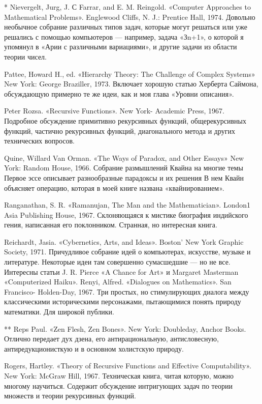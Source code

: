 * Nievergelt, Jurg, J. С Farrar, and E. M. Reingold. «Computer Approaches to Mathematical Problems». Englewood Cliffs, N. J.: Prentice Hall, 1974. Довольно необычное собрание различных типов задач, которые могут решаться или уже решались с помощью компьютеров --- например, задача «Зn+1», о которой я упомянул в «Арии с различными вариациями», и другие задачи из области теории чисел.

Pattee, Howard H., ed. «Hierarchy Theory: The Challenge of Complex Systems» New York: George Braziller, 1973. Включает хорошую статью Херберта Саймона, обсуждающую примерно те же идеи, как и моя глава «Уровни описания».

Peter Rozsa. «Recursive Functions». New York- Academic Press, 1967. Подробное обсуждение примитивно рекурсивных функций, общерекурсивных функций, частично рекурсивных функций, диагонального метода и других технических вопросов.

Quine, Willard Van Orman. «The Ways of Paradox, and Other Essays» New York: Random House, 1966. Собрание размышлений Квайна на многие темы Первое эссе описывает разнообразные парадоксы и их решения В нем Квайн объясняет операцию, которая в моей книге названа «квайнированием».

Ranganathan, S. R. «Ramanujan, The Man and the Mathematician». London1 Asia Publishing House, 1967. Склоняющаяся к мистике биография индийского гения, написанная его поклонником. Странная, но интересная книга.

Reichardt, Jasia. «Cybernetics, Arts, and Ideas». Boston' New York Graphic Society, 1971. Причудливое собрание идей о компьютерах, искусстве, музыке и литературе. Некоторые идеи там совершенно сумасшедшие --- но не все. Интересны статьи J. R. Pierce «A Chance for Art» и Margaret Masterman «Computerized Haiku». Renyi, Alfred. «Dialogues on Mathematics». San Francisco- Holden-Day, 1967. Три простых, но стимулирующих диалога между классическими историческими персонажами, пытающимися понять природу математики. Для широкой публики.

** Reps Paul. «Zen Flesh, Zen Bones». New York: Doubleday, Anchor Books. Отлично передает дух дзена, его антирациональную, антисловесную, антиредукционисткую и в основном холистскую природу.

Rogers, Hartley. «Theory of Recursive Functions and Effective Computability». New York: McGraw Hill, 1967. Техническая книга, читая которую, можно многому научиться. Содержит обсуждение интригующих задач по теории множеств и теории рекурсивных функций.

